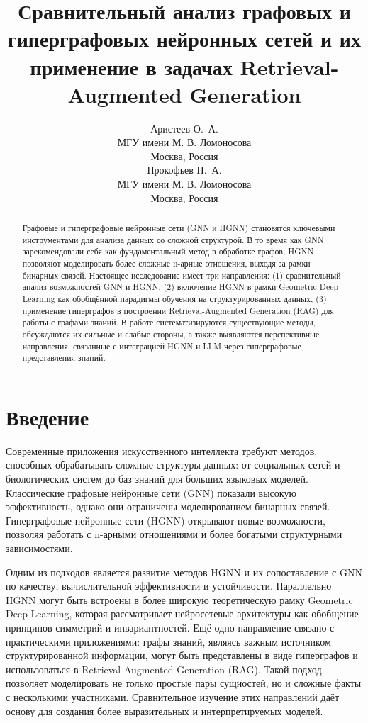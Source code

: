 \documentclass{article}
\title{Сравнительный анализ графовых и гиперграфовых нейронных сетей и их применение в задачах Retrieval-Augmented Generation}
\author{
  Аристеев О.~А. \\
  МГУ имени М. В. Ломоносова \\
  Москва, Россия \\
  \And
  Прокофьев П.~А. \\
  МГУ имени М. В. Ломоносова\\
  Москва, Россия \\ 
}
\date{}
\begin{document}
\maketitle

\begin{abstract}
Графовые и гиперграфовые нейронные сети (GNN и HGNN) становятся ключевыми инструментами для анализа данных со сложной структурой. В то время как GNN зарекомендовали себя как фундаментальный метод в обработке графов, HGNN позволяют моделировать более сложные n-арные отношения, выходя за рамки бинарных связей. Настоящее исследование имеет три направления: (1) сравнительный анализ возможностей GNN и HGNN, (2) включение HGNN в рамки Geometric Deep Learning как обобщённой парадигмы обучения на структурированных данных, (3) применение гиперграфов в построении Retrieval-Augmented Generation (RAG) для работы с графами знаний. В работе систематизируются существующие методы, обсуждаются их сильные и слабые стороны, а также выявляются перспективные направления, связанные с интеграцией HGNN и LLM через гиперграфовые представления знаний.
\end{abstract}


\section{Введение}

Современные приложения искусственного интеллекта требуют методов, способных обрабатывать сложные структуры данных: от социальных сетей и биологических систем до баз знаний для больших языковых моделей. Классические графовые нейронные сети (GNN) показали высокую эффективность, однако они ограничены моделированием бинарных связей. Гиперграфовые нейронные сети (HGNN) открывают новые возможности, позволяя работать с n-арными отношениями и более богатыми структурными зависимостями.

Одним из подходов является развитие методов HGNN и их сопоставление с GNN по качеству, вычислительной эффективности и устойчивости. Параллельно HGNN могут быть встроены в более широкую теоретическую рамку Geometric Deep Learning, которая рассматривает нейросетевые архитектуры как обобщение принципов симметрий и инвариантностей. Ещё одно направление связано с практическими приложениями: графы знаний, являясь важным источником структурированной информации, могут быть представлены в виде гиперграфов и использоваться в Retrieval-Augmented Generation (RAG). Такой подход позволяет моделировать не только простые пары сущностей, но и сложные факты с несколькими участниками. Сравнительное изучение этих направлений даёт основу для создания более выразительных и интерпретируемых моделей.
\end{document}
